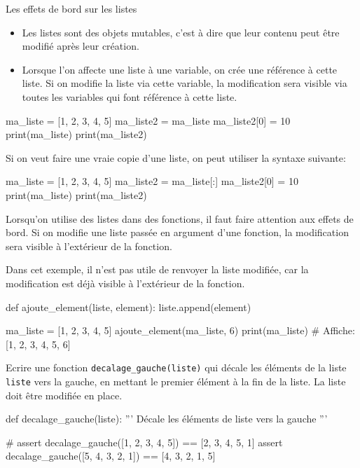\begin{easybox}{Les effets de bord sur les listes}{}
	\begin{itemize}
		\item Les listes sont des objets mutables, c'est à dire que leur contenu peut être modifié après leur création.
		\item Lorsque l'on affecte une liste à une variable, on crée une référence à cette liste. Si on modifie la liste via cette variable, la modification sera visible via toutes les variables qui font référence à cette liste.
	\end{itemize}

	\begin{ConsolePythontex}[Label=false]{}
ma_liste = [1, 2, 3, 4, 5]
ma_liste2 = ma_liste
ma_liste2[0] = 10
print(ma_liste)
print(ma_liste2)
		\end{ConsolePythontex}
\end{easybox}

Si on veut faire une vraie copie d'une liste, on peut utiliser la syntaxe suivante:
	\begin{ConsolePythontex}[Label=false]{}
ma_liste = [1, 2, 3, 4, 5]
ma_liste2 = ma_liste[:]
ma_liste2[0] = 10
print(ma_liste)
print(ma_liste2)
		\end{ConsolePythontex}

Lorsqu'on utilise des listes dans des fonctions, il faut faire attention aux effets de bord. Si on modifie une liste passée en argument d'une fonction, la modification sera visible à l'extérieur de la fonction.

Dans cet exemple, il n'est pas utile de renvoyer la liste modifiée, car la modification est déjà visible à l'extérieur de la fonction.
\begin{CodePythontexAlt}[Largeur=1\linewidth,Centre,PremLigne=1]{}	
def ajoute_element(liste, element):
	liste.append(element)

ma_liste = [1, 2, 3, 4, 5]
ajoute_element(ma_liste, 6)
print(ma_liste)			# Affiche: [1, 2, 3, 4, 5, 6]
		\end{CodePythontexAlt}

			\begin{exercice_cours}[Effets de bord et fonctions]{}
	 Ecrire une fonction \texttt{decalage\_gauche(liste)} qui décale les éléments de la liste \texttt{liste} vers la gauche, en mettant le premier élément à la fin de la liste. La liste doit être modifiée en place.
					\begin{CodePythontexAlt}[Largeur=1\linewidth,Centre,PremLigne=1, Lignes=false]{}
					def decalage_gauche(liste):
						''' Décale les éléments de liste vers la gauche '''




						


					#	
					assert decalage_gauche([1, 2, 3, 4, 5]) == [2, 3, 4, 5, 1]
					assert decalage_gauche([5, 4, 3, 2, 1]) == [4, 3, 2, 1, 5]
					\end{CodePythontexAlt}

			\end{exercice_cours}

